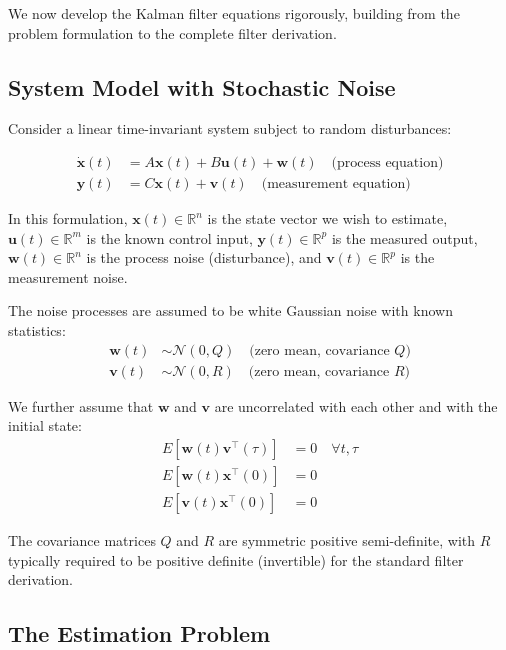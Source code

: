 We now develop the Kalman filter equations rigorously, building from the problem formulation to the complete filter derivation.

\subsection{System Model with Stochastic Noise}

Consider a linear time-invariant system subject to random disturbances:

\begin{equation}
\boxed{
\begin{aligned}
\dot{\mathbf{x}}(t) &= A\mathbf{x}(t) + B\mathbf{u}(t) + \mathbf{w}(t) \quad \text{(process equation)} \\
\mathbf{y}(t) &= C\mathbf{x}(t) + \mathbf{v}(t) \quad \text{(measurement equation)}
\end{aligned}
}
\label{eq:system_model}
\end{equation}

In this formulation, $\mathbf{x}(t) \in \mathbb{R}^n$ is the state vector we wish to estimate, $\mathbf{u}(t) \in \mathbb{R}^m$ is the known control input, $\mathbf{y}(t) \in \mathbb{R}^p$ is the measured output, $\mathbf{w}(t) \in \mathbb{R}^n$ is the process noise (disturbance), and $\mathbf{v}(t) \in \mathbb{R}^p$ is the measurement noise.

The noise processes are assumed to be white Gaussian noise with known statistics:
\begin{align}
\mathbf{w}(t) &\sim \mathcal{N}(0, Q) \quad \text{(zero mean, covariance } Q \text{)} \\
\mathbf{v}(t) &\sim \mathcal{N}(0, R) \quad \text{(zero mean, covariance } R \text{)}
\end{align}

We further assume that $\mathbf{w}$ and $\mathbf{v}$ are uncorrelated with each other and with the initial state:
\begin{align}
E[\mathbf{w}(t)\mathbf{v}^\top(\tau)] &= 0 \quad \forall t, \tau \\
E[\mathbf{w}(t)\mathbf{x}^\top(0)] &= 0 \\
E[\mathbf{v}(t)\mathbf{x}^\top(0)] &= 0
\end{align}

The covariance matrices $Q$ and $R$ are symmetric positive semi-definite, with $R$ typically required to be positive definite (invertible) for the standard filter derivation.

\subsection{The Estimation Problem}

